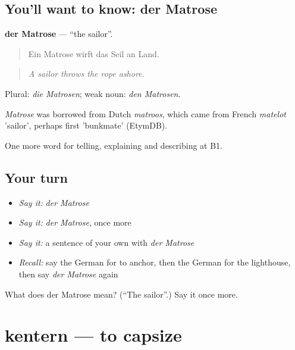 \subsection*{You'll want to know: der Matrose}
\textbf{der Matrose} — \textquotedblleft{}the sailor\textquotedblright{}.

\begin{quote}
Ein Matrose wirft das Seil an Land.
\end{quote}

\begin{quote}
\emph{A sailor throws the rope ashore.}
\end{quote}

Plural: \emph{die Matrosen}; weak noun: \emph{den Matrosen}.

\begin{cousinweb}
\emph{Matrose} was borrowed from Dutch \emph{matroos}, which came from French \emph{matelot} 'sailor', perhaps first 'bunkmate' (EtymDB).
\end{cousinweb}

\begin{grammarlens}[title={What you've built}]
One more word for telling, explaining and describing at B1.
\end{grammarlens}

\subsection*{Your turn}
\begin{itemize}
\raggedright
  \item \emph{Say it:} \emph{der Matrose}
  \item \emph{Say it:} \emph{der Matrose}, once more
  \item \emph{Say it:} a sentence of your own with \emph{der Matrose}
  \item \emph{Recall:} say the German for to anchor, then the German for the lighthouse, then say \emph{der Matrose} again
\end{itemize}

\begin{tcolorbox}[breakable,colback=teal!4,colframe=teal!35!black,title={Before you move on}]
What does der Matrose mean? (\textquotedblleft{}The sailor\textquotedblright{}.) Say it once more.
\end{tcolorbox}
\section[kentern]{kentern — to capsize}

